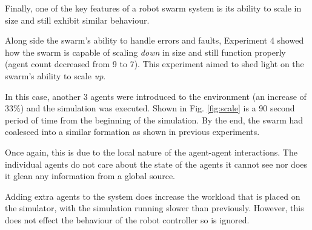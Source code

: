 Finally, one of the key features of a robot swarm system is its ability to scale in size and still exhibit similar behaviour. 

Along side the swarm's ability to handle errors and faults, Experiment 4 showed how the swarm is capable of scaling \textit{down} in size and still function properly (agent count decreased from 9 to 7). This experiment aimed to shed light on the swarm's ability to scale \textit{up}.

In this case, another 3 agents were introduced to the environment (an increase of 33\%) and the simulation was executed. Shown in Fig. \ref{fig:scale} is a 90 second period of time from the beginning of the simulation. By the end, the swarm had coalesced into a similar formation as shown in previous experiments. 

Once again, this is due to the local nature of the agent-agent interactions. The individual agents do not care about the state of the agents it cannot see nor does it glean any information from a global source.

Adding extra agents to the system does increase the workload that is placed on the simulator, with the simulation running slower than previously. However, this does not effect the behaviour of the robot controller so is ignored. 